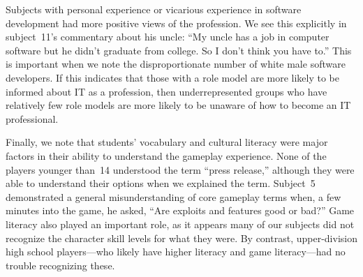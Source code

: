 \documentclass[letterpaper]{article}
\begin{document}
Subjects with personal experience or vicarious experience in software
development had more positive views of the profession.
We see this explicitly in subject~11's commentary about his uncle:
``My uncle has a
job in computer software but he didn’t graduate from college. So I
don’t think you have to.'' This is important when we note the
disproportionate number of white male software developers. If this
indicates that those with a role model are more likely to be informed
about IT as a profession, then underrepresented groups 
who have relatively few role models are more likely
to be unaware of how to become an IT professional.

Finally, we note that students' vocabulary and cultural literacy
were major factors in their ability to understand the gameplay
experience.
None of the players younger than~14 understood the term ``press release,''
although they were able to understand their options when we explained
the term.
Subject~5 demonstrated a general misunderstanding of core
gameplay terms when, a few minutes into the game, he asked,
``Are exploits and features good or bad?''
Game literacy also played an important role, as it appears many of
our subjects did not recognize the character skill levels for what they were.
By contrast, upper-division high school players---who likely have
higher literacy and game literacy---had no trouble recognizing these.


\end{document}
